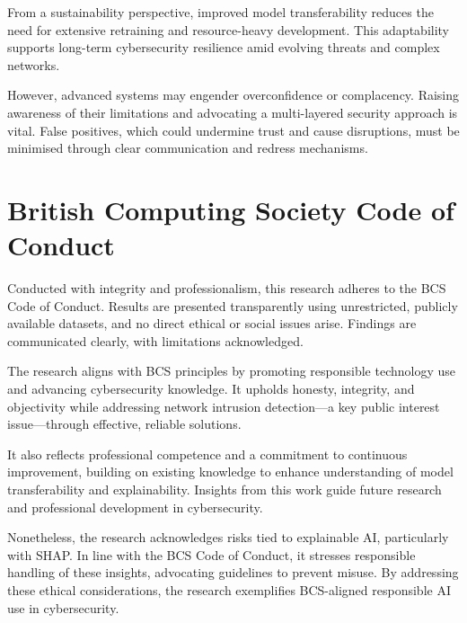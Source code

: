 From a sustainability perspective, improved model transferability reduces the need for extensive retraining and resource-heavy development. This adaptability supports long-term cybersecurity resilience amid evolving threats and complex networks.

However, advanced systems may engender overconfidence or complacency. Raising awareness of their limitations and advocating a multi-layered security approach is vital. False positives, which could undermine trust and cause disruptions, must be minimised through clear communication and redress mechanisms.

\section{British Computing Society Code of Conduct}
Conducted with integrity and professionalism, this research adheres to the BCS Code of Conduct. Results are presented transparently using unrestricted, publicly available datasets, and no direct ethical or social issues arise. Findings are communicated clearly, with limitations acknowledged.

The research aligns with BCS principles by promoting responsible technology use and advancing cybersecurity knowledge. It upholds honesty, integrity, and objectivity while addressing network intrusion detection—a key public interest issue—through effective, reliable solutions.

It also reflects professional competence and a commitment to continuous improvement, building on existing knowledge to enhance understanding of model transferability and explainability. Insights from this work guide future research and professional development in cybersecurity.

Nonetheless, the research acknowledges risks tied to explainable AI, particularly with SHAP. In line with the BCS Code of Conduct, it stresses responsible handling of these insights, advocating guidelines to prevent misuse. By addressing these ethical considerations, the research exemplifies BCS-aligned responsible AI use in cybersecurity.